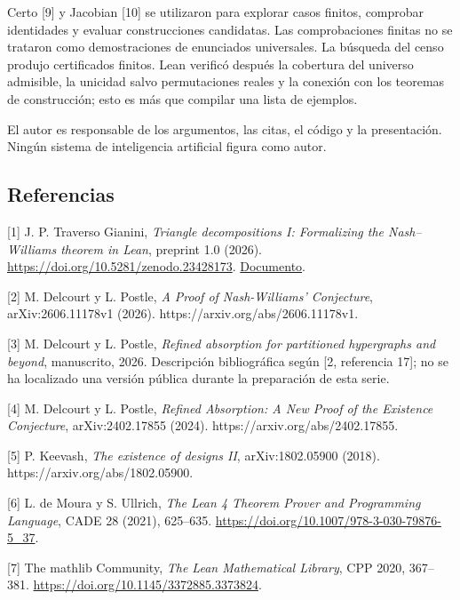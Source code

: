 \documentclass[spanish,11pt,a4paper]{article}
\begin{document}
Certo {[}9{]} y Jacobian {[}10{]} se utilizaron para explorar casos finitos, comprobar identidades y evaluar construcciones candidatas. Las comprobaciones finitas no se trataron como demostraciones de enunciados universales. La búsqueda del censo produjo certificados finitos. Lean verificó después la cobertura del universo admisible, la unicidad salvo permutaciones reales y la conexión con los teoremas de construcción; esto es más que compilar una lista de ejemplos.

El autor es responsable de los argumentos, las citas, el código y la presentación. Ningún sistema de inteligencia artificial figura como autor.


\clearpage
\subsection{Referencias}\label{referencias}

\begingroup\small\raggedright
\setlength{\parskip}{3pt}

{[}1{]} J. P. Traverso Gianini, \emph{Triangle decompositions I: Formalizing the Nash--Williams theorem in Lean}, preprint 1.0 (2026). \url{https://doi.org/10.5281/zenodo.23428173}. \href{https://github.com/jtraverso/nash-williams-triangle-decompositions-release/blob/main/preprints/PAPER_I/01_manuscript/PAPER_I_preprint_v1.0_es.md}{Documento}.

{[}2{]} M. Delcourt y L. Postle, \emph{A Proof of Nash-Williams' Conjecture}, arXiv:2606.11178v1 (2026). https://arxiv.org/abs/2606.11178v1.

{[}3{]} M. Delcourt y L. Postle, \emph{Refined absorption for partitioned hypergraphs and beyond}, manuscrito, 2026. Descripción bibliográfica según {[}2, referencia 17{]}; no se ha localizado una versión pública durante la preparación de esta serie.

{[}4{]} M. Delcourt y L. Postle, \emph{Refined Absorption: A New Proof of the Existence Conjecture}, arXiv:2402.17855 (2024). https://arxiv.org/abs/2402.17855.

{[}5{]} P. Keevash, \emph{The existence of designs II}, arXiv:1802.05900 (2018). https://arxiv.org/abs/1802.05900.

{[}6{]} L. de Moura y S. Ullrich, \emph{The Lean 4 Theorem Prover and Programming Language}, CADE 28 (2021), 625--635. \url{https://doi.org/10.1007/978-3-030-79876-5_37}.

{[}7{]} The mathlib Community, \emph{The Lean Mathematical Library}, CPP 2020, 367--381. \url{https://doi.org/10.1145/3372885.3373824}.
\end{document}
